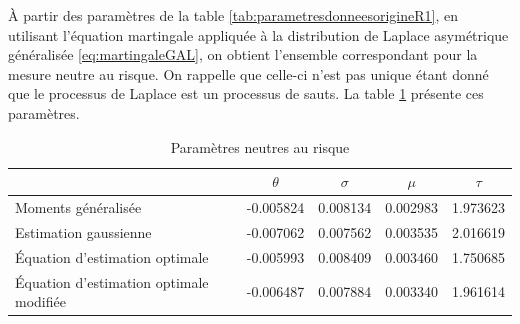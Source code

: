 À partir des paramètres de la table
\ref{tab:parametresdonneesorigineR1}, en utilisant l'équation
martingale appliquée à la distribution de Laplace asymétrique
généralisée \eqref{eq:martingaleGAL}, on obtient l'ensemble
correspondant pour la mesure neutre au risque. On rappelle que
celle-ci n'est pas unique étant donné que le processus de Laplace est
un processus de sauts. La table \ref{tab:paramrisqueneutreR1} présente
ces paramètres.
\begin{table}[!ht]
  \centering
  \begin{tabular}{lcccc}
    \hline
    & $\theta$ & $\sigma$ & $\mu$ & $\tau$ \\ 
    \hline
    Moments généralisée & -0.005824 & 0.008134 & 0.002983 & 1.973623 \\ 
    Estimation gaussienne & -0.007062 & 0.007562 & 0.003535 & 2.016619 \\ 
    Équation d'estimation optimale & -0.005993 & 0.008409 & 0.003460 & 1.750685 \\ 
    Équation d'estimation optimale modifiée & -0.006487 & 0.007884 & 0.003340 & 1.961614 \\ 
    \hline
  \end{tabular}
  \caption{Paramètres neutres au risque}
  \label{tab:paramrisqueneutreR1}
\end{table}

